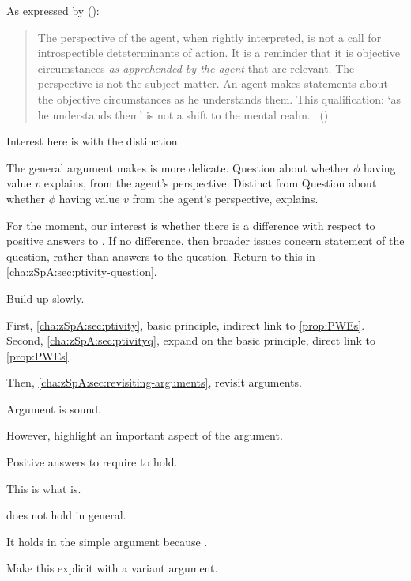 \begin{note}
  As expressed by \citeauthor{Collins:1997wn} (\citeyear{Collins:1997wn}):
  \begin{quote}
    The perspective of the agent, when rightly interpreted, is not a call for introspectible deteterminants of action.
    It is a reminder that it is objective circumstances \emph{as apprehended by the agent} that are relevant.
    The perspective is not the subject matter.
    An agent makes statements about the objective circumstances as he understands them.
    This qualification: `as he understands them' is not a shift to the mental realm.%
    \mbox{ }\hfill\mbox{(\citeyear[120]{Collins:1997wn})}
  \end{quote}
\end{note}

\begin{note}
  Interest here is with the distinction.

  The general argument \citeauthor{Dancy:2000aa} makes is more delicate.
  Question about whether \(\phi\) having value \(v\) explains, from the agent's perspective.
  Distinct from Question about whether \(\phi\) having value \(v\) from the agent's perspective, explains.

  For the moment, our interest is whether there is a difference with respect to positive answers to \qzS{}.
  If no difference, then broader issues concern statement of the question, rather than answers to the question.
  \hyperref[return-to-dancy]{Return to this} in \autoref{cha:zSpA:sec:ptivity-question}.
\end{note}


\begin{note}
  Build up slowly.

  First, \autoref{cha:zSpA:sec:ptivity}, basic principle, indirect link to \autoref{prop:PWEs}.
  Second, \autoref{cha:zSpA:sec:ptivityq}, expand on the basic principle, direct link to \autoref{prop:PWEs}.

  Then, \autoref{cha:zSpA:sec:revisiting-arguments}, revisit arguments.
\end{note}


\begin{note}
  Argument is sound.

  However, highlight an important aspect of the argument.

  Positive answers to \qzS{} require \ptivity{} to hold.

  This is what \ptivity{} is.

  \ptivity{} does not hold in general.

  It holds in the simple argument because \qzS{}.

  Make this explicit with a variant argument.
\end{note}

